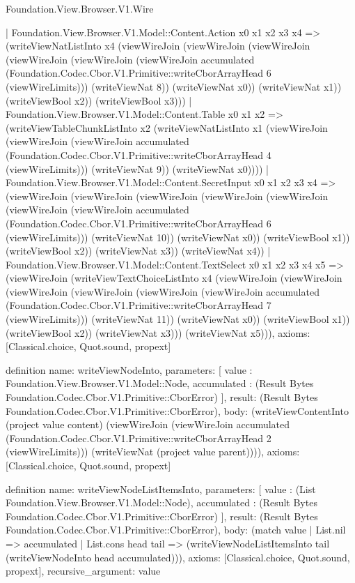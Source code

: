 \begin{lexlean}{Foundation.View.Browser.V1.Wire}
\begin{semanticmodule}
{    | Foundation.View.Browser.V1.Model::Content.Action x0 x1 x2 x3 x4 => (writeViewNatListInto x4 (viewWireJoin (viewWireJoin (viewWireJoin (viewWireJoin (viewWireJoin (viewWireJoin accumulated (Foundation.Codec.Cbor.V1.Primitive::writeCborArrayHead 6 (viewWireLimits))) (writeViewNat 8)) (writeViewNat x0)) (writeViewNat x1)) (writeViewBool x2)) (writeViewBool x3)))
    | Foundation.View.Browser.V1.Model::Content.Table x0 x1 x2 => (writeViewTableChunkListInto x2 (writeViewNatListInto x1 (viewWireJoin (viewWireJoin (viewWireJoin accumulated (Foundation.Codec.Cbor.V1.Primitive::writeCborArrayHead 4 (viewWireLimits))) (writeViewNat 9)) (writeViewNat x0))))
    | Foundation.View.Browser.V1.Model::Content.SecretInput x0 x1 x2 x3 x4 => (viewWireJoin (viewWireJoin (viewWireJoin (viewWireJoin (viewWireJoin (viewWireJoin (viewWireJoin accumulated (Foundation.Codec.Cbor.V1.Primitive::writeCborArrayHead 6 (viewWireLimits))) (writeViewNat 10)) (writeViewNat x0)) (writeViewBool x1)) (writeViewBool x2)) (writeViewNat x3)) (writeViewNat x4))
    | Foundation.View.Browser.V1.Model::Content.TextSelect x0 x1 x2 x3 x4 x5 => (viewWireJoin (writeViewTextChoiceListInto x4 (viewWireJoin (viewWireJoin (viewWireJoin (viewWireJoin (viewWireJoin (viewWireJoin accumulated (Foundation.Codec.Cbor.V1.Primitive::writeCborArrayHead 7 (viewWireLimits))) (writeViewNat 11)) (writeViewNat x0)) (writeViewBool x1)) (writeViewBool x2)) (writeViewNat x3))) (writeViewNat x5))),
  axioms: [Classical.choice, Quot.sound, propext]
}

definition{
  name: writeViewNodeInto,
  parameters: [
    value : Foundation.View.Browser.V1.Model::Node,
    accumulated : (Result Bytes Foundation.Codec.Cbor.V1.Primitive::CborError)
  ],
  result: (Result Bytes Foundation.Codec.Cbor.V1.Primitive::CborError),
  body: (writeViewContentInto (project value content) (viewWireJoin (viewWireJoin accumulated (Foundation.Codec.Cbor.V1.Primitive::writeCborArrayHead 2 (viewWireLimits))) (writeViewNat (project value parent)))),
  axioms: [Classical.choice, Quot.sound, propext]
}

definition{
  name: writeViewNodeListItemsInto,
  parameters: [
    value : (List Foundation.View.Browser.V1.Model::Node),
    accumulated : (Result Bytes Foundation.Codec.Cbor.V1.Primitive::CborError)
  ],
  result: (Result Bytes Foundation.Codec.Cbor.V1.Primitive::CborError),
  body: (match value
    | List.nil => accumulated
    | List.cons head tail => (writeViewNodeListItemsInto tail (writeViewNodeInto head accumulated))),
  axioms: [Classical.choice, Quot.sound, propext],
  recursive_argument: value
}


\end{semanticmodule}
\end{lexlean}
